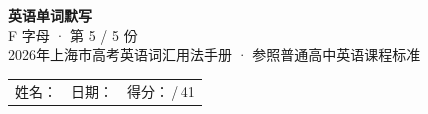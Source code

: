 \documentclass[10pt,a4paper]{article}
\begin{document}
\pagestyle{plain}

\begin{center}
{\LARGE\bfseries 英语单词默写}\\[0.22em]
{\large F 字母 · 第 5 / 5 份}\\[0.18em]
{\small 2026年上海市高考英语词汇用法手册 · 参照普通高中英语课程标准}
\end{center}

\vspace{0.25em}
\noindent\begin{tabular}{@{}p{}@{}p{}@{}p{}@{}}
姓名：\underline{\hspace{2.0cm}} & 日期：\underline{\hspace{2.0cm}} & 得分：\underline{\hspace{1.3cm}}\,/\,41 \\
\end{tabular}

\vspace{0.3em}

\vspace{0.08em}
\end{document}
